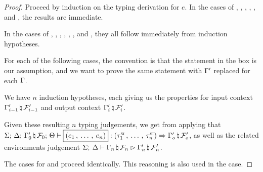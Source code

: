 \begin{proof}
  Proceed by induction on the typing derivation for $e$. In the cases of
  , , , ,
  , and , the results are immediate.

  In the cases of , , ,
  , , , and
  , they all follow immediately from induction hypotheses.

  For each of the following cases, the convention is that the statement in the
  box is our assumption, and we want to prove the same statement with
  $\Gamma^\prime$ replaced for each $\Gamma$.

  \vspace{1em}
  \noindent {}

  We have $n$ induction hypotheses, each giving us the properties for input
  context $\Gamma^\prime_{i-1} \, \natural \, \mathcal{F}^\prime_{i-1}$ and output context
  $\Gamma^\prime_i \, \natural \, \mathcal{F}^\prime_i$.

  Given these resulting $n$ typing judgements, we get from applying
   that
  $\oxtypjudge{\oxglobalctx}{\oxtvarctx}{\oxkontctx}{\oxnewframe{\oxvarctx^\prime_0}{\oxframe_0}}{
    \oxprod{\oxexpr_1 \oxdotsc \oxexpr_n} }{\oxtprod{\oxsitype_1 \oxdotsc
      \oxsitype_n}}{ \oxnewframe{\oxvarctx^\prime_o}{\oxframe^\prime_o} }$, as
  well as the related environments judgement
  $\Sigma; \: \Delta \vdash \Gamma_n \, \natural \, \mathcal{F}_n \rhd \Gamma_n^\prime \, \natural \, \mathcal{F}_n^\prime$.

  The cases for  and  proceed identically. This
  reasoning is also used in the  case.



\end{proof}
